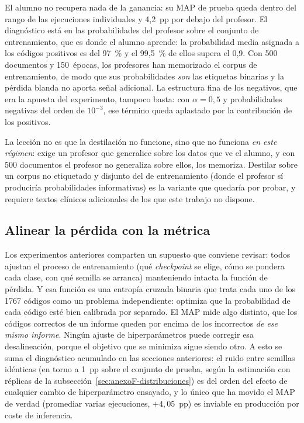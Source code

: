 El alumno no recupera nada de la ganancia: su MAP de prueba queda dentro del rango de las ejecuciones individuales y 4{,}2~pp por debajo del profesor. El diagnóstico está en las probabilidades del profesor sobre el conjunto de entrenamiento, que es donde el alumno aprende: la probabilidad media asignada a los códigos positivos es del 97~\% y el 99{,}5~\% de ellos supera el 0{,}9. Con 500 documentos y 150~épocas, los profesores han memorizado el corpus de entrenamiento, de modo que sus probabilidades \emph{son} las etiquetas binarias y la pérdida blanda no aporta señal adicional. La estructura fina de los negativos, que era la apuesta del experimento, tampoco basta: con $\alpha=0{,}5$ y probabilidades negativas del orden de $10^{-3}$, ese término queda aplastado por la contribución de los positivos.

La lección no es que la destilación no funcione, sino que no funciona \emph{en este régimen}: exige un profesor que generalice sobre los datos que ve el alumno, y con 500 documentos el profesor no generaliza sobre ellos, los memoriza. Destilar sobre un corpus no etiquetado y disjunto del de entrenamiento (donde el profesor sí produciría probabilidades informativas) es la variante que quedaría por probar, y requiere textos clínicos adicionales de los que este trabajo no dispone.

\subsection{Alinear la pérdida con la métrica}
\label{sec:anexoF-alineacion}

Los experimentos anteriores comparten un supuesto que conviene revisar: todos ajustan el proceso de entrenamiento (qué \emph{checkpoint} se elige, cómo se pondera cada clase, con qué semilla se arranca) manteniendo intacta la función de pérdida. Y esa función es una entropía cruzada binaria que trata cada uno de los 1767 códigos como un problema independiente: optimiza que la probabilidad de cada código esté bien calibrada por separado. El MAP mide algo distinto, que los códigos correctos de un informe queden por encima de los incorrectos \emph{de ese mismo informe}. Ningún ajuste de hiperparámetros puede corregir esa desalineación, porque el objetivo que se minimiza sigue siendo otro. A esto se suma el diagnóstico acumulado en las secciones anteriores: el ruido entre semillas idénticas (en torno a 1~pp sobre el conjunto de prueba, según la estimación con réplicas de la subsección~\ref{sec:anexoF-distribuciones}) es del orden del efecto de cualquier cambio de hiperparámetro ensayado, y lo único que ha movido el MAP de verdad (promediar varias ejecuciones, $+4{,}05$~pp) es inviable en producción por coste de inferencia.

